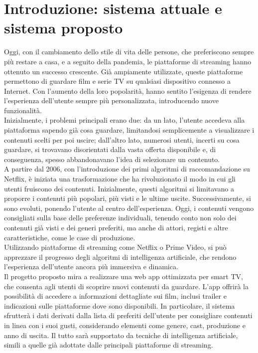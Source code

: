 \documentclass[a4paper,12pt]{article}
\begin{document}
\section{Introduzione: sistema attuale e sistema proposto}
Oggi, con il cambiamento dello stile di vita delle persone, che preferiscono sempre più restare a casa, e a seguito della pandemia, le piattaforme di streaming hanno ottenuto un successo crescente. Già ampiamente utilizzate, queste piattaforme permettono di guardare film e serie TV su qualsiasi dispositivo connesso a Internet. Con l’aumento della loro popolarità, hanno sentito l’esigenza di rendere l’esperienza dell’utente sempre più personalizzata, introducendo nuove funzionalità.\\
Inizialmente, i problemi principali erano due: da un lato, l’utente accedeva alla piattaforma sapendo già cosa guardare, limitandosi semplicemente a visualizzare i contenuti scelti per poi uscire; dall’altro lato, numerosi utenti, incerti su cosa guardare, si trovavano disorientati dalla vasta offerta disponibile e, di conseguenza, spesso abbandonavano l’idea di selezionare un contenuto.\\
A partire dal 2006, con l’introduzione dei primi algoritmi di raccomandazione su Netflix, è iniziata una trasformazione che ha rivoluzionato il modo in cui gli utenti fruiscono dei contenuti. Inizialmente, questi algoritmi si limitavano a proporre i contenuti più popolari, più visti e le ultime uscite. Successivamente, si sono evoluti, ponendo l’utente al centro dell’esperienza. Oggi, i contenuti vengono consigliati sulla base delle preferenze individuali, tenendo conto non solo dei contenuti già visti e dei generi preferiti, ma anche di attori, registi e altre caratteristiche, come le case di produzione.\\
Utilizzando piattaforme di streaming come Netflix o Prime Video, si può apprezzare il progresso degli algoritmi di intelligenza artificiale, che rendono l’esperienza dell’utente ancora più immersiva e dinamica.\\
Il progetto proposto mira a realizzare una web app ottimizzata per smart TV, che consenta agli utenti di scoprire nuovi contenuti da guardare. L’app offrirà la possibilità di accedere a informazioni dettagliate sui film, inclusi trailer e indicazioni sulle piattaforme dove sono disponibili. In particolare, il sistema sfrutterà i dati derivati dalla lista di preferiti dell’utente per consigliare contenuti in linea con i suoi gusti, considerando elementi come genere, cast, produzione e anno di uscita. Il tutto sarà supportato da tecniche di intelligenza artificiale, simili a quelle già adottate dalle principali piattaforme di streaming.
\end{document}
